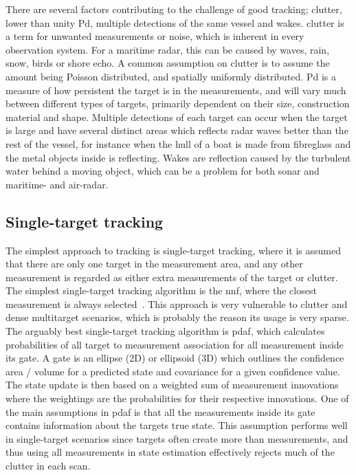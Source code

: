 There are several factors contributing to the challenge of good tracking; \gls{clutter}, lower than unity \gls{Pd}, multiple detections of the same vessel and wakes. \Gls{clutter} is a term for unwanted measurements or noise, which is inherent in every observation system. For a maritime radar, this can be caused by waves, rain, snow, birds or shore echo. A common assumption on clutter is to assume the amount being Poisson distributed, and spatially uniformly distributed. \gls{Pd} is a measure of how persistent the target is in the measurements, and will vary much between different types of targets, primarily dependent on their size, construction material and shape. Multiple detections of each target can occur when the target is large and have several distinct areas which reflects radar waves better than the rest of the vessel, for instance when the hull of a boat is made from fibreglass and the metal objects inside is reflecting. Wakes are reflection caused by the turbulent water behind a moving object, which can be a problem for both sonar and maritime- and air-radar.

\subsection{Single-target tracking}
The simplest approach to tracking is single-target tracking, where it is assumed that there are only one target in the measurement area, and any other measurement is regarded as either extra measurements of the target or \gls{clutter}. The simplest single-target tracking algorithm is the \gls{nnf}, where the closest measurement is always selected~\cite{Bar-Shalom1998}. This approach is very vulnerable to clutter and dense multitarget scenarios, which is probably the reason its usage is very sparse. The arguably best single-target tracking algorithm is \gls{pdaf}, which calculates probabilities of all target to measurement association for all measurement inside its gate. A gate is an ellipse (2D) or ellipsoid (3D) which outlines the confidence area / volume for a predicted state and covariance for a given confidence value. The state update is then based on a weighted sum of measurement innovations where the weightings are the probabilities for their respective innovations. One of the main assumptions in \gls{pdaf} is that all the measurements inside its gate contains information about the targets true state. This assumption performs well in single-target scenarios since targets often create more than measurements, and thus using all measurements in state estimation effectively rejects much of the \gls{clutter} in each \gls{scan}.

